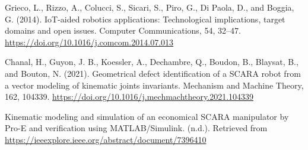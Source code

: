 \documentclass[final]{foresj}
\begin{document}
\begin{thebibliography}{9}
Grieco, L., Rizzo, A., Colucci, S., Sicari, S., Piro, G., Di Paola, D., and Boggia, G. (2014). IoT-aided robotics applications: Technological implications, target domains and open issues. Computer Communications, 54, 32–47. \url{https://doi.org/10.1016/j.comcom.2014.07.013}

Chanal, H., Guyon, J. B., Koessler, A., Dechambre, Q., Boudon, B., Blaysat, B., and Bouton, N. (2021). Geometrical defect identification of a SCARA robot from a vector modeling of kinematic joints invariants. Mechanism and Machine Theory, 162, 104339. \url{https://doi.org/10.1016/j.mechmachtheory.2021.104339}

Kinematic modeling and simulation of an economical SCARA manipulator by Pro-E and verification using MATLAB/Simulink. (n.d.). Retrieved from \url{https://ieeexplore.ieee.org/abstract/document/7396410}

\end{thebibliography}
\end{document}

